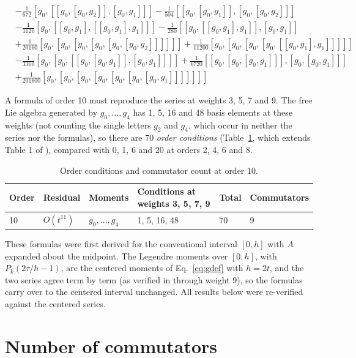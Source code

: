 \documentclass[12pt]{article}
\begin{document}
\begin{equation}
\begin{aligned}
&-\tfrac{1}{672}[g_{0},[[g_{0},[g_{0},g_{2}]],[g_{0},g_{1}]]]-\tfrac{1}{504}[[g_{0},[g_{0},g_{1}]],[g_{0},[g_{0},g_{2}]]]\\
&-\tfrac{1}{1120}[g_{0},[[g_{0},g_{1}],[[g_{0},g_{1}],g_{1}]]]-\tfrac{1}{280}[[g_{0},[[g_{0},g_{1}],g_{1}]],[g_{0},g_{1}]]\\
&+\tfrac{1}{20160}[g_{0},[g_{0},[g_{0},[g_{0},[g_{0},[g_{0},g_{2}]]]]]]+\tfrac{1}{11200}[g_{0},[g_{0},[g_{0},[g_{0},[[g_{0},g_{1}],g_{1}]]]]]\\
&-\tfrac{1}{3360}[g_{0},[g_{0},[[g_{0},[g_{0},g_{1}]],[g_{0},g_{1}]]]]+\tfrac{1}{6720}[[g_{0},[g_{0},[g_{0},g_{1}]]],[g_{0},[g_{0},g_{1}]]]\\
&+\tfrac{1}{201600}[g_{0},[g_{0},[g_{0},[g_{0},[g_{0},[g_{0},[g_{0},g_{1}]]]]]]]
\end{aligned}\label{eq:series9}
\end{equation}

A formula of order 10 must reproduce the series at weights 3, 5, 7 and 9. The free Lie algebra generated by $g_0,\ldots,g_4$ has 1, 5, 16 and 48 basis elements at these weights (not counting the single letters $g_2$ and $g_4$, which occur in neither the series nor the formulas), so there are 70 \emph{order conditions} (Table~\ref{tab:conditions}, which extends Table 1 of \cite{j28}), compared with 0, 1, 6 and 20 at orders 2, 4, 6 and 8.

\begin{table}[H]
\centering\small
\caption{Order conditions and commutator count at order 10.}\label{tab:conditions}
\begin{tabular}{llllll}
\hline
Order & Residual & Moments & Conditions at weights 3, 5, 7, 9 & Total & Commutators \\ \hline
10 & $O(t^{11})$ & $g_0,\ldots,g_4$ & 1, 5, 16, 48 & 70 & 9 \\ \hline
\end{tabular}
\end{table}

These formulas were first derived for the conventional interval $[0,h]$ with $A$ expanded about the midpoint. The Legendre moments over $[0,h]$, with $P_k(2\tau/h-1)$, are the centered moments of Eq.~\ref{eq:gdef} with $h=2t$, and the two series agree term by term (as verified in \cite{j28} through weight 9), so the formulas carry over to the centered interval unchanged. All results below were re-verified against the centered series.

\section*{Number of commutators}
\end{document}
